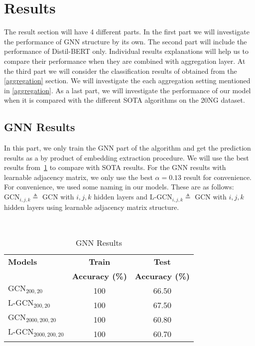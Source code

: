 \section{Results}\label{sec:results}
The result section will have 4 different parts. In the first part we will investigate the performance of GNN structure by its own. The second part will include the performance of Distil-BERT only. Individual results explanations will help us to compare their performance when they are combined with aggregation layer. At the third part we will consider the classification results of obtained \DOCEM{} from the \cref{aggregation} section. We will investigate the each aggregation setting mentioned in \cref{aggregation}. As a last part, we will investigate the performance of our model when it is compared with the different SOTA algorithms on the 20NG dataset.
\subsection{GNN Results}
In this part, we only train the GNN part of the algorithm and get the prediction results as a by product of embedding extraction procedure. We will use the best results from~\cref{tab:results:gnn} to compare with SOTA results. For the GNN results with learnable adjacency matrix, we only use the best \(\alpha=0.13\) result for convenience. For convenience, we used some naming in our models. These are as follows: \(\text{GCN}_{i,j,k} \triangleq \) GCN with \(i,j,k\) hidden layers and \(\text{L-GCN}_{i,j,k} \triangleq \) GCN with \(i,j,k\) hidden layers using learnable adjacency matrix structure.
\begin{table}[ht]
    \centering{}
    \caption{GNN Results}~\label{tab:results:gnn}
    \begin{tabular}{lcc}\toprule
        \textbf{Models}                & \textbf{Train}         & \textbf{Test}          \\
                                       & \textbf{Accuracy (\%)} & \textbf{Accuracy (\%)} \\ \midrule
        \(\text{GCN}_{200,20}\)        & 100                    & 66.50                  \\
        \(\text{L-GCN}_{200,20}\)      & 100                    & 67.50                  \\
        \(\text{GCN}_{2000,200,20}\)   & 100                    & 60.80                  \\
        \(\text{L-GCN}_{2000,200,20}\) & 100                    & 60.70                  \\
        \bottomrule
    \end{tabular}
\end{table}

